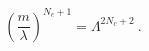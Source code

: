 \begin{equation}
\label{eq:Condi1}
\left(\frac{m}{\lambda}\right)^{N_c+1}= \Lambda^{2N_c+2} \ .
\end{equation}

